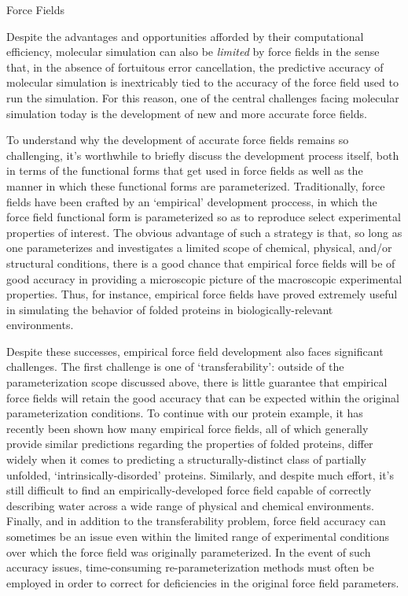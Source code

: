 \begin{section}{Force Fields}

Despite the advantages and opportunities afforded by their computational efficiency, molecular
simulation can also be \emph{limited} by force fields in the sense that, in
the absence of fortuitous error cancellation, the predictive accuracy of
molecular simulation is inextricably tied to the accuracy of the force field
used to run the simulation. For this reason, one of the central challenges
facing molecular simulation today is the development of new and more accurate
force fields.\cite{Freddolino2010,Ballone2014}

To understand why the development of accurate force fields remains so
challenging, it's worthwhile to briefly discuss the development process
itself, both in terms of the functional forms that get used in force fields as
well as the manner in which these functional forms are parameterized.
Traditionally, force fields have been crafted by an `empirical' development
proccess,\cite{Stone2007}
in which the force field functional form is parameterized so as to reproduce
select experimental properties of interest. The obvious advantage of such a
strategy is that, so long as one parameterizes and investigates a limited
scope of chemical, physical, and/or structural conditions, 
there is a good chance that empirical force fields will be of good accuracy in
providing a microscopic picture of the macroscopic experimental properties.
Thus, for instance, empirical force fields have proved extremely useful
in simulating the behavior of folded proteins in
biologically-relevant environments.
\cite{Caleman2011,Piana2014,Lopes2015} 

Despite these successes, empirical force field development also faces
significant challenges. The first challenge is one of `transferability':
outside of the parameterization scope discussed above,
there is little
guarantee that empirical force fields will retain 
the good accuracy that can be expected within the original parameterization
conditions.
\cite{Hornak2006,Freddolino2010}
To continue with our protein example, it has recently been shown how many
empirical force fields, all of which generally provide similar predictions
regarding the properties of folded proteins, differ widely when it comes to
predicting a structurally-distinct class of partially unfolded,
`intrinsically-disorded' proteins.
\cite{Rauscher2015,Piana2014}
Similarly, and despite much effort, it's still difficult to find an
empirically-developed force field capable of correctly describing
water across a wide range of physical and chemical environments.
\cite{Cisneros2016a,Jorgensen2005}
Finally, and in addition to the transferability problem, 
force field accuracy can sometimes be an
issue 
even within the limited range of experimental conditions over which the force
field was originally parameterized. In the event of such accuracy issues,
time-consuming re-parameterization methods must often be employed
in order to correct for deficiencies in the original force field parameters.
\cite{Hornak2006,Freddolino2010}


\end{section}
